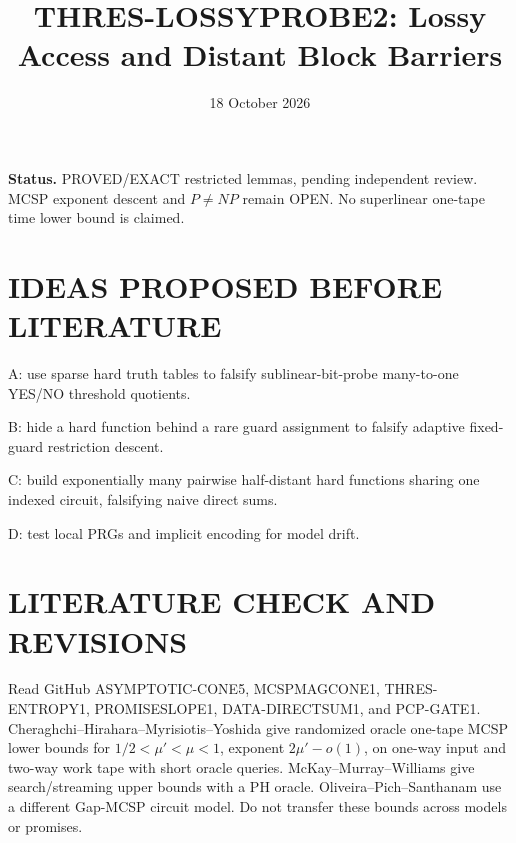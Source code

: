 \documentclass{article}
\title{THRES-LOSSYPROBE2: Lossy Access and Distant Block Barriers}
\date{18 October 2026}
\begin{document}
\maketitle
\noindent\textbf{Status.} PROVED/EXACT restricted lemmas,
pending independent review. MCSP exponent descent and $P\ne NP$
remain OPEN. No superlinear one-tape time lower bound is claimed.
\section{IDEAS PROPOSED BEFORE LITERATURE}
\item[] A: use sparse hard truth tables to falsify sublinear-bit-probe
many-to-one YES/NO threshold quotients.
\item[] B: hide a hard function behind a rare guard assignment to
falsify adaptive fixed-guard restriction descent.
\item[] C: build exponentially many pairwise half-distant hard
functions sharing one indexed circuit, falsifying naive direct sums.
\item[] D: test local PRGs and implicit encoding for model drift.
\section{LITERATURE CHECK AND REVISIONS}
Read GitHub ASYMPTOTIC-CONE5, MCSPMAGCONE1, THRES-ENTROPY1,
PROMISESLOPE1, DATA-DIRECTSUM1, and PCP-GATE1.
Cheraghchi--Hirahara--Myrisiotis--Yoshida \cite{CHMY2020}
give randomized oracle one-tape MCSP lower bounds for
$1/2<\mu'<\mu<1$, exponent $2\mu'-o(1)$, on one-way input
and two-way work tape with short oracle queries.
McKay--Murray--Williams \cite{MMW2019} give search/streaming
upper bounds with a PH oracle. Oliveira--Pich--Santhanam
\cite{OPS2018} use a different Gap-MCSP circuit model.
Do not transfer these bounds across models or promises.
\end{document}
